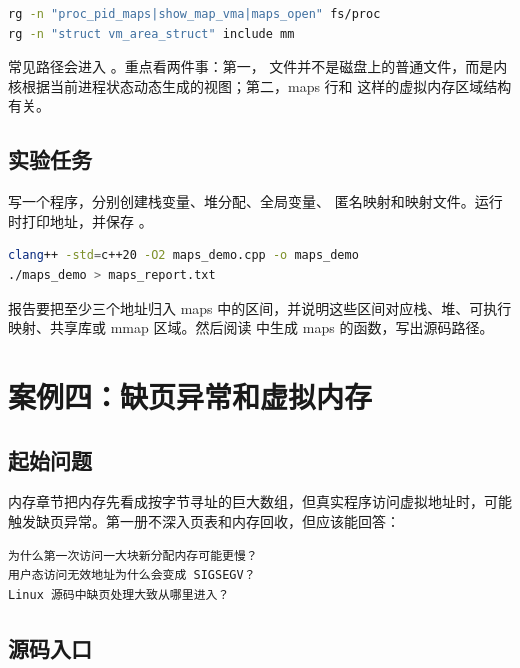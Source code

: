 \begin{lstlisting}[language=bash]
rg -n "proc_pid_maps|show_map_vma|maps_open" fs/proc
rg -n "struct vm_area_struct" include mm
\end{lstlisting}

常见路径会进入 。重点看两件事：第一， 文件并不是磁盘上的普通文件，而是内核根据当前进程状态动态生成的视图；第二，maps 行和  这样的虚拟内存区域结构有关。

\subsection{实验任务}

\begin{labbox}
写一个程序，分别创建栈变量、堆分配、全局变量、 匿名映射和映射文件。运行时打印地址，并保存 。

\begin{lstlisting}[language=bash]
clang++ -std=c++20 -O2 maps_demo.cpp -o maps_demo
./maps_demo > maps_report.txt
\end{lstlisting}

报告要把至少三个地址归入 maps 中的区间，并说明这些区间对应栈、堆、可执行映射、共享库或 mmap 区域。然后阅读  中生成 maps 的函数，写出源码路径。
\end{labbox}

\section{案例四：缺页异常和虚拟内存}

\subsection{起始问题}

内存章节把内存先看成按字节寻址的巨大数组，但真实程序访问虚拟地址时，可能触发缺页异常。第一册不深入页表和内存回收，但应该能回答：

\begin{lstlisting}
为什么第一次访问一大块新分配内存可能更慢？
用户态访问无效地址为什么会变成 SIGSEGV？
Linux 源码中缺页处理大致从哪里进入？
\end{lstlisting}

\subsection{源码入口}

